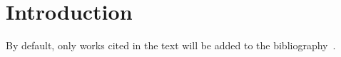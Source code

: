 \chapter{Introduction}

By default, only works cited in the text will be added to the bibliography~\cite{latexcompanion}.
